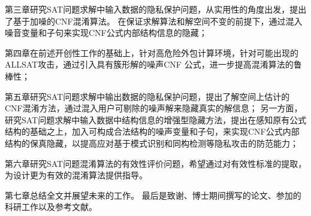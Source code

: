 第三章研究SAT问题求解中输入数据的隐私保护问题，从实用性的角度出发，提出了基于加噪的CNF混淆算法。
在保证求解算法和解空间不变的前提下，通过混入噪音变量和子句来实现CNF公式内部结构信息的隐藏；

第四章在前述开创性工作的基础上，针对高危险外包计算环境，针对可能出现的ALLSAT攻击，通过引入具有簇形解的噪声CNF 公式，进一步提高混淆算法的鲁棒性；

第五章研究SAT问题求解中输出数据的隐私保护问题，提出了解空间上估计的CNF混淆方法，通过混入用户可剔除的噪声解来隐藏真实的解信息；
另一方面，研究SAT问题求解中输入数据中结构信息的增强型隐藏方法，提出在感知原有公式结构的基础之上，加入可构成合法结构的噪声变量和子句，来实现CNF公式内部结构的保真隐藏，以提高应对基于模式识别和同构检测等隐私攻击的防范能力；

第六章研究SAT问题混淆算法的有效性评价问题，希望通过对有效性标准的提取，为设计更为有效的混淆算法提供指导。
%

第七章总结全文并展望未来的工作。
最后是致谢、博士期间撰写的论文、参加的科研工作以及参考文献。
